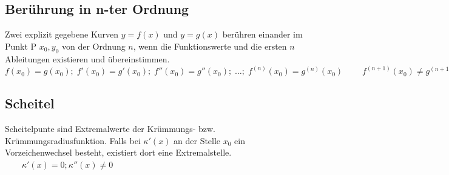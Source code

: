 \subsection{Berührung in n-ter Ordnung}
Zwei explizit gegebene Kurven $y = f(x)$ und $y = g(x)$ berühren einander im
Punkt P $x_0, y_0$ von der Ordnung $n$, wenn die Funktionswerte und die ersten
$n$ Ableitungen existieren und übereinstimmen.\\
$f(x_0) = g(x_0);\; f'(x_0) = g'(x_0);\; f''(x_0) = g''(x_0);\;\ldots ;
\;f^{(n)}(x_0) = g^{(n)}(x_0)\; \qquad f^{(n+1)}(x_0) \neq g^{(n+1)}(x_0)$

\subsection{Scheitel }
Scheitelpunte sind Extremalwerte der Krümmungs- bzw. Krümmungsradiusfunktion.
Falls bei $\kappa'(x)$ an der Stelle $x_0$ ein Vorzeichenwechsel besteht, existiert dort
eine Extremalstelle. 
$\qquad \kappa'(x) = 0; \kappa''(x) \neq 0$

